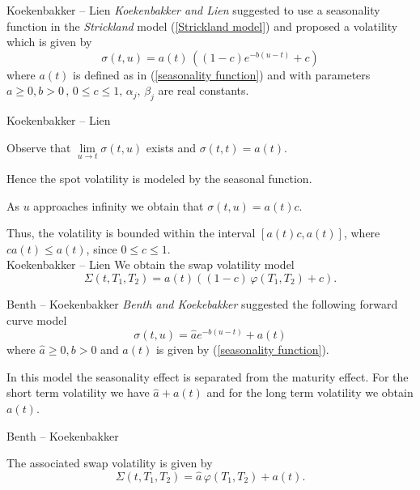 {Koekenbakker -- Lien}
\emph{Koekenbakker and Lien} suggested to use a seasonality function in the \emph{Strickland} model (\ref{Strickland model}) and proposed a volatility which is given by
\begin{equation}
\sigma(t,u)=a(t)\, ((1-c)e^{-b(u-t)}+c)
\end{equation}
where $a(t)$ is defined as in (\ref{seasonality function}) and with parameters $a \ge 0, b > 0\, ,\, 0 \le c \le 1, \,\alpha_j, \, \beta_j$ are real constants.

{Koekenbakker -- Lien}


	Observe that $\lim \limits_{u \to t} \sigma(t,u)$ exists and $\sigma(t,t)=a(t)$.

	Hence the spot volatility is modeled by the seasonal function.

	As $u$ approaches infinity we obtain that $\sigma(t,u)=a(t)c$.

	Thus, the volatility is bounded within the interval $[a(t)c, a(t)]$, where $ca(t) \le a(t)$, since $0 \le c \le 1$.\\


{Koekenbakker -- Lien}
We obtain the swap volatility model
\begin{equation}
\Sigma(t,T_1,T_2)=a(t) ((1-c)\, \varphi(T_1,T_2)+c).
\end{equation}

{Benth -- Koekenbakker}
\emph{Benth and Koekebakker} suggested the following forward curve model
\begin{equation}
\sigma(t,u)=\hat{a} e^{-b(u-t)}+a(t)
\end{equation}
where $\hat{a} \ge 0, b>0$ and $a(t)$ is given by (\ref{seasonality function}).

In this model the seasonality effect is separated from the maturity effect. For the short term volatility we have $\hat{a}+a(t)$ and for the long term volatility we obtain $a(t)$.

{Benth -- Koekenbakker}

The associated swap volatility is given by
\begin{equation}
\Sigma(t,T_1,T_2)=\hat{a}\, \varphi(T_1,T_2) +a(t).
\end{equation}

